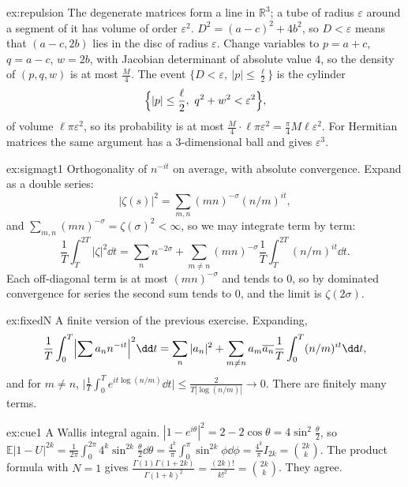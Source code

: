 \begin{solution}{ex:repulsion}
\idea The degenerate matrices form a line in $\mathbb R^3$; a tube of radius $\varepsilon$ around a segment of it has volume of order $\varepsilon^2$.
\writeup $D^2=(a-c)^2+4b^2$, so $D<\varepsilon$ means that $(a-c,2b)$ lies in the disc of radius $\varepsilon$. Change variables to $p=a+c$, $q=a-c$, $w=2b$, with Jacobian
determinant of absolute value $4$, so the density of $(p,q,w)$ is at most $\frac M4$. The event $\{D<\varepsilon,\ |p|\le\frac\ell2\}$ is the cylinder
\[
\Bigl\{|p|\le\frac\ell2,\ q^2+w^2<\varepsilon^2\Bigr\},
\]
of volume $\ell\pi\varepsilon^2$, so its probability is at most
$\frac M4\cdot\ell\pi\varepsilon^2=\frac\pi4M\ell\varepsilon^2$. For Hermitian matrices the same argument has a $3$-dimensional ball and gives
$\varepsilon^3$.
\end{solution}

\begin{solution}{ex:sigmagt1}
\idea Orthogonality of $n^{-it}$ on average, with absolute convergence.
\writeup Expand as a double series:
\[
|\zeta(s)|^2=\sum_{m,n}(mn)^{-\sigma}(n/m)^{it},
\]
and $\sum_{m,n}(mn)^{-\sigma}=\zeta(\sigma)^2<\infty$, so we may integrate term by term:
\[
\frac1T\int_T^{2T}|\zeta|^2\dd t=\sum_n n^{-2\sigma}+\sum_{m\ne n}(mn)^{-\sigma}\frac1T\int_T^{2T}(n/m)^{it}\dd t.
\]
Each off-diagonal term is at most $(mn)^{-\sigma}$ and
tends to $0$, so by dominated convergence for series the second sum tends to $0$, and the limit is $\zeta(2\sigma)$.
\end{solution}

\begin{solution}{ex:fixedN}
\idea A finite version of the previous exercise.
\writeup Expanding,
\[
\frac1T\int_0^T\Bigl|\sum a_nn^{-it}\Bigr|^2\dd t=\sum_n|a_n|^2+\sum_{m\ne n}a_m\overline{a_n}\frac1T\int_0^T(n/m)^{it}\dd t,
\]
and for $m\ne n$,
$\bigl|\frac1T\int_0^Te^{it\log(n/m)}\dd t\bigr|\le\frac2{T|\log(n/m)|}\to0$. There are finitely many terms.
\end{solution}

\begin{solution}{ex:cue1}
\idea A Wallis integral again.
\writeup $|1-e^{i\theta}|^2=2-2\cos\theta=4\sin^2\frac\theta2$, so $\mathbb E|1-U|^{2k}=\frac1{2\pi}\int_0^{2\pi}4^k\sin^{2k}\frac\theta2\dd\theta=\frac{4^k}\pi\int_0^\pi\sin^{2k}\phi\dd\phi=\frac{4^k}\pi I_{2k}=\binom{2k}k$.
The product formula with $N=1$ gives $\frac{\Gamma(1)\Gamma(1+2k)}{\Gamma(1+k)^2}=\frac{(2k)!}{k!^2}=\binom{2k}k$. They agree.
\end{solution}

